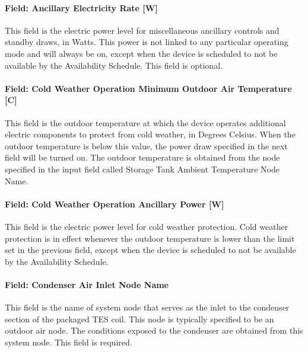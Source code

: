 \paragraph{Field: Ancillary Electricity Rate {[}W{]}}\label{field-ancillary-electric-power-w}

This field is the electric power level for miscellaneous ancillary controls and standby draws, in Watts. This power is not linked to any particular operating mode and will always be on, except when the device is scheduled to not be available by the Availability Schedule. This field is optional.

\paragraph{Field: Cold Weather Operation Minimum Outdoor Air Temperature {[}C{]}}\label{field-cold-weather-operation-minimum-outdoor-air-temperature-c}

This field is the outdoor temperature at which the device operates additional electric components to protect from cold weather, in Degrees Celsius. When the outdoor temperature is below this value, the power draw specified in the next field will be turned on. The outdoor temperature is obtained from the node specified in the input field called Storage Tank Ambient Temperature Node Name.

\paragraph{Field: Cold Weather Operation Ancillary Power {[}W{]}}\label{field-cold-weather-operation-ancillary-power-w}

This field is the electric power level for cold weather protection. Cold weather protection is in effect whenever the outdoor temperature is lower than the limit set in the previous field, except when the device is scheduled to not be available by the Availability Schedule.

\paragraph{Field: Condenser Air Inlet Node Name}\label{field-condenser-air-inlet-node-name-5}

This field is the name of system node that serves as the inlet to the condenser section of the packaged TES coil. This node is typically specified to be an outdoor air node. The conditions exposed to the condenser are obtained from this system node. This field is required.


